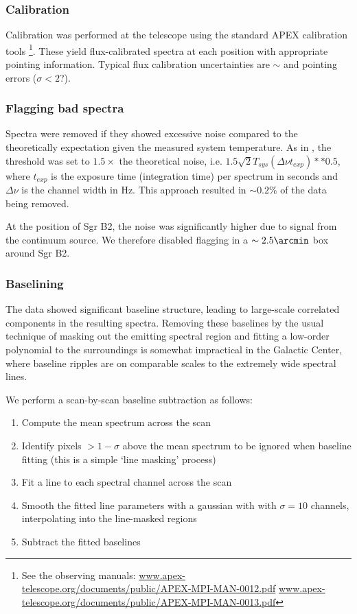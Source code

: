 \subsubsection{Calibration}
Calibration was performed at the telescope using the standard APEX calibration tools
\footnote{See the observing manuals:
\url{www.apex-telescope.org/documents/public/APEX-MPI-MAN-0012.pdf}
\url{www.apex-telescope.org/documents/public/APEX-MPI-MAN-0013.pdf} }.
These yield flux-calibrated spectra at each position with appropriate pointing
information.  Typical flux calibration uncertainties are $\sim$  and
pointing errors  ($\sigma<2$\arcsec ?).

\subsubsection{Flagging bad spectra}
Spectra were removed if they showed excessive noise compared to the
theoretically expectation given the measured system temperature.  As in
\citet{Ao2013a}, the threshold was set to $1.5\times$ the theoretical noise,
i.e. $1.5 \sqrt{2} T_{sys} (\Delta\nu t_{exp})**0.5$, where $t_{exp}$ is the
exposure time (integration time) per spectrum in seconds and $\Delta\nu$ is the
channel width in Hz.  This approach resulted in $\sim0.2\%$ of the data being
removed.  

At the position of Sgr B2, the noise was significantly higher due to signal
from the continuum source.  We therefore disabled flagging in a
$\sim2.5\arcmin$ box around Sgr B2.


\subsubsection{Baselining}
\label{sec:baseline}
The data showed significant baseline structure, leading to large-scale
correlated components in the resulting spectra.  Removing these baselines by
the usual technique of masking out the emitting spectral region and fitting a
low-order polynomial to the surroundings is somewhat impractical in the
Galactic Center, where baseline ripples are on comparable scales to the
extremely wide spectral lines.

We perform a scan-by-scan baseline subtraction as follows: 
\begin{enumerate}
    \item Compute the mean spectrum across the scan
    \item Identify pixels $>1-\sigma$ above the mean spectrum to be ignored
        when baseline fitting (this is a simple `line masking' process)
    \item Fit a line to each spectral channel across the scan
    \item Smooth the fitted line parameters with a gaussian with with
        $\sigma=10$ channels, interpolating into the line-masked regions
    \item Subtract the fitted baselines
\end{enumerate}

